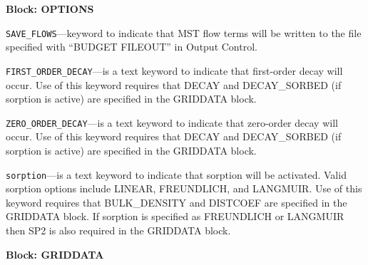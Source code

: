 
\item \textbf{Block: OPTIONS}

\begin{description}
\item \texttt{SAVE\_FLOWS}---keyword to indicate that MST flow terms will be written to the file specified with ``BUDGET FILEOUT'' in Output Control.

\item \texttt{FIRST\_ORDER\_DECAY}---is a text keyword to indicate that first-order decay will occur.  Use of this keyword requires that DECAY and DECAY\_SORBED (if sorption is active) are specified in the GRIDDATA block.

\item \texttt{ZERO\_ORDER\_DECAY}---is a text keyword to indicate that zero-order decay will occur.  Use of this keyword requires that DECAY and DECAY\_SORBED (if sorption is active) are specified in the GRIDDATA block.

\item \texttt{sorption}---is a text keyword to indicate that sorption will be activated.  Valid sorption options include LINEAR, FREUNDLICH, and LANGMUIR.  Use of this keyword requires that BULK\_DENSITY and DISTCOEF are specified in the GRIDDATA block.  If sorption is specified as FREUNDLICH or LANGMUIR then SP2 is also required in the GRIDDATA block.

\end{description}
\item \textbf{Block: GRIDDATA}

